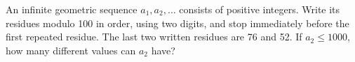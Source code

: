 An infinite geometric sequence $a_1,a_2,\ldots$ consists of positive integers. Write its residues modulo 100 in order, using two digits, and stop immediately before the first repeated residue. The last two written residues are 76 and 52. If $a_2\le1000$, how many different values can $a_2$ have?
